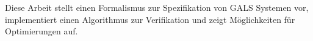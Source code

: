 Diese Arbeit stellt einen Formalismus zur Spezifikation von GALS Systemen vor, implementiert einen Algorithmus zur Verifikation und zeigt Möglichkeiten für Optimierungen auf.
